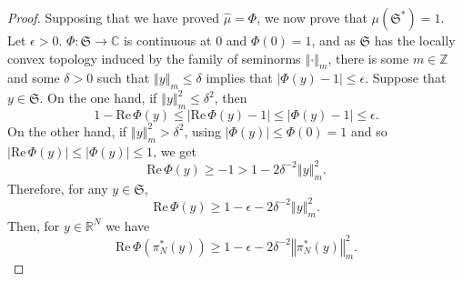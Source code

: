 \documentclass{article}
\def\Re{\ensuremath{\mathrm{Re}}\,}
\newcommand{\norm}[1]{\left\Vert #1 \right\Vert}
\theoremstyle{definition}
\begin{document}
\begin{proof}
Supposing that we have proved $\hat{\mu}=\Phi$, we now prove that $\mu(\mathfrak{S}^*)=1$.
Let $\epsilon>0$. $\Phi:\mathfrak{S} \to \mathbb{C}$ is continuous at $0$ and $\Phi(0)=1$, and as $\mathfrak{S}$ has the locally convex
topology induced by the family of seminorms $\norm{\cdot}_m$,
 there is some $m \in \mathbb{Z}$
and some $\delta>0$ such that $\norm{y}_m \leq \delta$ implies that $|\Phi(y)-1| \leq \epsilon$. Suppose that $y \in \mathfrak{S}$.
On the one hand, if $\norm{y}_m^2 \leq \delta^2$, then
\[
1-\Re \Phi(y)  \leq |\Re \Phi(y)-1| \leq |\Phi(y)-1| \leq \epsilon.
\]
On the other hand, if $\norm{y}_m^2 > \delta^2$, using $|\Phi(y)| \leq \Phi(0)=1$ and so $ |\Re \Phi(y)| \leq |\Phi(y)| \leq 1$, we
get  
\[
\Re \Phi(y) \geq -1 > 1 - 2\delta^{-2} \norm{y}_m^2.
\]
Therefore, for any $y \in \mathfrak{S}$,
\[
\Re \Phi(y) \geq 1-\epsilon-2\delta^{-2} \norm{y}_m^2.
\]
Then, for $y \in \mathbb{R}^N$ we have
\begin{equation}
\Re \Phi(\pi_N^*(y)) \geq 1-\epsilon-2\delta^{-2} \norm{\pi_N^*(y)}_m^2.
\label{realphi}
\end{equation}


\end{proof}
\end{document}
